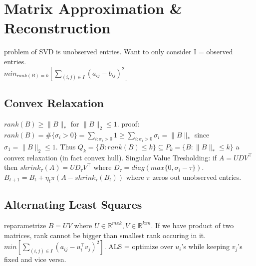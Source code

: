 \section{Matrix Approximation \& Reconstruction}
problem of SVD is unobserved entries. Want to only consider I = observed entries. \\
$min_{rank(B)=k}[\sum_{(i,j) \in I}(a_{ij} - b_{ij})^2]$
\subsection*{Convex Relaxation}
\textbullet $rank(B) \geq \|B\|_*$ for $\|B\|_2 \leq 1$. proof: $rank(B)=\#\{\sigma_i >0\}=\sum_{i:\sigma_i>0}1 \geq \sum_{i:\sigma_i>0}\sigma_i = \|B\|_*$ since $\sigma_1 = \|B\|_2  \leq 1$. Thus $Q_k = \{B:rank(B) \leq k\} \subseteq P_k = \{B:\|B\|_* \leq k\}$ a convex relaxation (in fact convex hull). \textbullet
Singular Value Tresholding: if $A=UDV^\top$ then $shrink_\tau(A)=UD_\tau V^\top$ where $D_\tau=diag(max\{0,\sigma_i-\tau\})$. $B_{t+1}=B_t+\eta_t\pi(A-shrink_\tau(B_t))$ where $\pi$ zeros out unobserved entries.

\subsection*{Alternating Least Squares}
reparametrize $B=UV$ where $U \in \mathbb{R}^{mxk}, V \in \mathbb{R}^{kxn}$. If we have product of two matrices, rank cannot be bigger than smallest rank occuring in it. $min[\sum_{(i,j) \in I}(a_{ij} - u_i^\top v_j)^2]$. ALS = optimize over $u_i$'s while keeping $v_j$'s fixed and vice versa.


